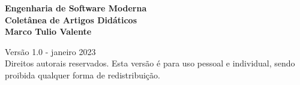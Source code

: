 \thispagestyle{empty}

\newpage
\thispagestyle{empty}
\vspace*{4cm}
\begin{center}
{\Huge \bf Engenharia de Software Moderna}\\ 
\vspace*{0.8cm}
{\Huge \bf Coletânea de Artigos Didáticos}\\ 
\vspace*{3cm}
{\Large \bf Marco Tulio Valente}
\end{center}
\newpage

\thispagestyle{empty}
\vspace*{3cm}
\begin{center}
{\Large  Versão 1.0 - janeiro 2023}\\ 
\vspace*{1cm}
{Direitos autorais reservados. Esta versão é para uso pessoal e individual, sendo proibida qualquer forma de redistribuição.}
\end{center}
\newpage

\tableofcontents
